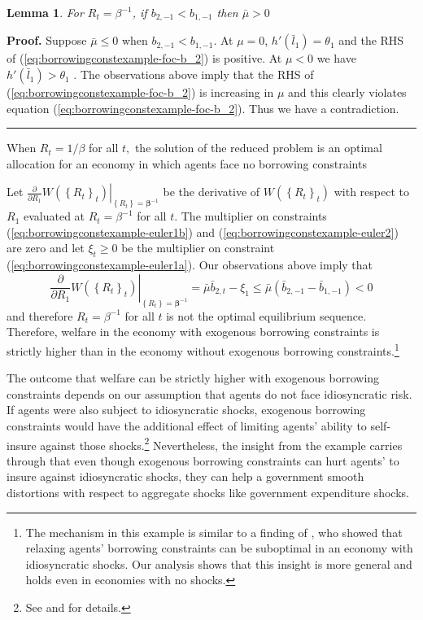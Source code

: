 \documentclass[thmsb,11pt]{article}
\newtheorem{lemma}{Lemma}
\newenvironment{proof}[1][Proof]{\noindent \textbf{#1.} }{\  \rule{0.5em}{0.5em}}
\begin{document}
\begin{lemma}
 For $R_t=\beta^{-1}$, if $b_{2,-1}<b_{1,-1}$ then $\bar{\mu}>0$
\end{lemma}
\begin{proof}
 Suppose $\bar{\mu}\leq0$ when $b_{2,-1}<b_{1,-1}$.  At $\mu=0$, $h'(\bar{l}_1)=\theta_1$  and the RHS of (\ref{eq:borrowingconstexample-foc-b_2}) is positive.  At $\mu<0$ we have $h'(\bar{l}_1)>\theta_1$ . The observations above imply that the RHS of (\ref{eq:borrowingconstexample-foc-b_2}) is increasing in $\mu$ and this clearly violates equation (\ref{eq:borrowingconstexample-foc-b_2}).  Thus we have a contradiction.
 \end{proof}
\smallskip

When $R_{t}=1/\beta $ for all $t,$
the solution of the reduced problem is an optimal allocation for an economy
in which agents face no borrowing constraints

Let $\left. \frac{\partial }{\partial R_{1}}W\left( \left \{ R_{t}\right \}
_{t}\right) \right \vert _{\left \{ R_{t}\right \} =\bm{\beta }^{-1}}$
be the derivative of $W\left( \left \{ R_{t}\right \} _{t}\right) $ with
respect to $R_{1}$ evaluated at $R_{t}=\beta ^{-1}$ for all $t$. The multiplier on constraints  (\ref{eq:borrowingconstexample-euler1b}) and (\ref{eq:borrowingconstexample-euler2}) are zero and let $\xi_t\geq0$ be the multiplier on constraint (\ref{eq:borrowingconstexample-euler1a}). Our
observations above imply that
\begin{equation*}
\left. \frac{\partial }{\partial R_{1}}W\left( \left \{ R_{t}\right \}
_{t}\right) \right \vert _{\left \{ R_{t}\right \} =\bm{\beta }^{-1}}=%
\bar{\mu}\bar{b}_{2,t}-\xi_1\leq\bar{\mu}\left( \bar{b}_{2,-1}-\bar{b}%
_{1,-1}\right) <0
\end{equation*}
and therefore $R_{t}=\beta ^{-1}$ for all $t$ is not the optimal equilibrium
sequence. Therefore, welfare in the economy with exogenous borrowing
constraints is strictly higher than in the economy without exogenous
borrowing constraints.\footnote{%
The mechanism in this example is similar to a finding of \cite{Yared2012}, who
showed that relaxing agents' borrowing constraints can be suboptimal in an
economy with idiosyncratic shocks. Our analysis shows that this insight is
more general and holds even in economies with no shocks.}

The outcome that welfare can be strictly higher with exogenous borrowing
constraints depends on our assumption that agents do not face idiosyncratic risk. If agents were also subject to idiosyncratic shocks,
exogenous borrowing constraints would have the additional effect of limiting
agents' ability to self-insure against those shocks.\footnote{%
See \cite{Aiyagari1998} and \cite{Heathcote2005} for details.}
Nevertheless, the insight from the example carries through that even though exogenous
borrowing constraints can hurt agents' to insure against idiosyncratic shocks, they
can help a government smooth distortions with respect to aggregate shocks
like government expenditure shocks.
\end{document}
